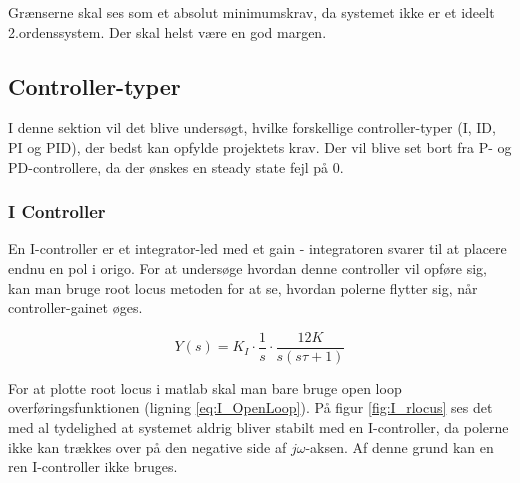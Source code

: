 Grænserne skal ses som et absolut minimumskrav, da systemet ikke er et ideelt 2.ordenssystem. Der skal helst være en god margen.

\subsection{Controller-typer}

I denne sektion vil det blive undersøgt, hvilke forskellige controller-typer (I, ID, PI og PID), der bedst kan opfylde projektets krav. Der vil blive set bort fra P- og PD-controllere, da der ønskes en steady state fejl på 0. 

\subsubsection{I Controller}

En I-controller er et integrator-led med et gain - integratoren svarer til at placere endnu en pol i origo. For at undersøge hvordan denne controller vil opføre sig, kan man bruge root locus metoden for at se, hvordan polerne flytter sig, når controller-gainet øges. 

\begin{equation}\label{eq:I_OpenLoop}
Y(s)=K_{I}\cdot\frac{1}{s}\cdot\frac{12K}{s(s\tau+1)}
\end{equation}

For at plotte root locus i matlab skal man bare bruge open loop overføringsfunktionen (ligning \ref{eq:I_OpenLoop}). På figur \ref{fig:I_rlocus} ses det med al tydelighed at systemet aldrig bliver stabilt med en I-controller, da polerne ikke kan trækkes over på den negative side af $j\omega$-aksen. Af denne grund kan en ren I-controller ikke bruges.

